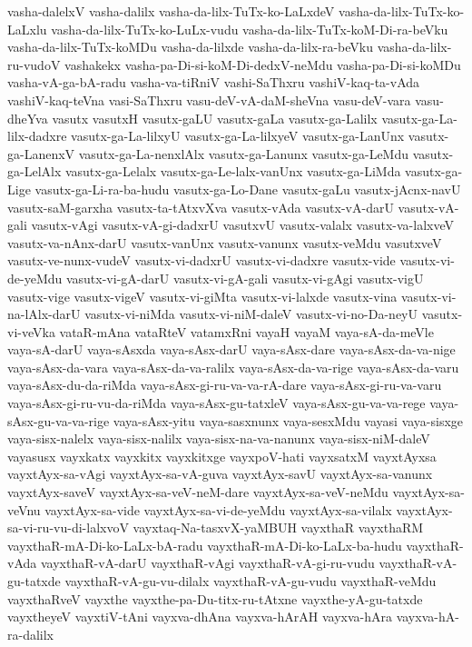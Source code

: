 {vasha-dalelxV
vasha-dalilx
vasha-da-lilx-TuTx-ko-LaLxdeV
vasha-da-lilx-TuTx-ko-LaLxlu
vasha-da-lilx-TuTx-ko-LuLx-vudu
vasha-da-lilx-TuTx-koM-Di-ra-beVku
vasha-da-lilx-TuTx-koMDu
vasha-da-lilxde
vasha-da-lilx-ra-beVku
vasha-da-lilx-ru-vudoV
vashakekx
vasha-pa-Di-si-koM-Di-dedxV-neMdu
vasha-pa-Di-si-koMDu
vasha-vA-ga-bA-radu
vasha-va-tiRniV
vashi-SaThxru
vashiV-kaq-ta-vAda
vashiV-kaq-teVna
vasi-SaThxru
vasu-deV-vA-daM-sheVna
vasu-deV-vara
vasu-dheYva
vasutx
vasutxH
vasutx-gaLU
vasutx-gaLa
vasutx-ga-Lalilx
vasutx-ga-La-lilx-dadxre
vasutx-ga-La-lilxyU
vasutx-ga-La-lilxyeV
vasutx-ga-LanUnx
vasutx-ga-LanenxV
vasutx-ga-La-nenxlAlx
vasutx-ga-Lanunx
vasutx-ga-LeMdu
vasutx-ga-LelAlx
vasutx-ga-Lelalx
vasutx-ga-Le-lalx-vanUnx
vasutx-ga-LiMda
vasutx-ga-Lige
vasutx-ga-Li-ra-ba-hudu
vasutx-ga-Lo-Dane
vasutx-gaLu
vasutx-jAcnx-navU
vasutx-saM-garxha
vasutx-ta-tAtxvXva
vasutx-vAda
vasutx-vA-darU
vasutx-vA-gali
vasutx-vAgi
vasutx-vA-gi-dadxrU
vasutxvU
vasutx-valalx
vasutx-va-lalxveV
vasutx-va-nAnx-darU
vasutx-vanUnx
vasutx-vanunx
vasutx-veMdu
vasutxveV
vasutx-ve-nunx-vudeV
vasutx-vi-dadxrU
vasutx-vi-dadxre
vasutx-vide
vasutx-vi-de-yeMdu
vasutx-vi-gA-darU
vasutx-vi-gA-gali
vasutx-vi-gAgi
vasutx-vigU
vasutx-vige
vasutx-vigeV
vasutx-vi-giMta
vasutx-vi-lalxde
vasutx-vina
vasutx-vi-na-lAlx-darU
vasutx-vi-niMda
vasutx-vi-niM-daleV
vasutx-vi-no-Da-neyU
vasutx-vi-veVka
vataR-mAna
vataRteV
vatamxRni
vayaH
vayaM
vaya-sA-da-meVle
vaya-sA-darU
vaya-sAsxda
vaya-sAsx-darU
vaya-sAsx-dare
vaya-sAsx-da-va-nige
vaya-sAsx-da-vara
vaya-sAsx-da-va-ralilx
vaya-sAsx-da-va-rige
vaya-sAsx-da-varu
vaya-sAsx-du-da-riMda
vaya-sAsx-gi-ru-va-va-rA-dare
vaya-sAsx-gi-ru-va-varu
vaya-sAsx-gi-ru-vu-da-riMda
vaya-sAsx-gu-tatxleV
vaya-sAsx-gu-va-va-rege
vaya-sAsx-gu-va-va-rige
vaya-sAsx-yitu
vaya-sasxnunx
vaya-sesxMdu
vayasi
vaya-sisxge
vaya-sisx-nalelx
vaya-sisx-nalilx
vaya-sisx-na-va-nanunx
vaya-sisx-niM-daleV
vayasusx
vayxkatx
vayxkitx
vayxkitxge
vayxpoV-hati
vayxsatxM
vayxtAyxsa
vayxtAyx-sa-vAgi
vayxtAyx-sa-vA-guva
vayxtAyx-savU
vayxtAyx-sa-vanunx
vayxtAyx-saveV
vayxtAyx-sa-veV-neM-dare
vayxtAyx-sa-veV-neMdu
vayxtAyx-sa-veVnu
vayxtAyx-sa-vide
vayxtAyx-sa-vi-de-yeMdu
vayxtAyx-sa-vilalx
vayxtAyx-sa-vi-ru-vu-di-lalxvoV
vayxtaq-Na-tasxvX-yaMBUH
vayxthaR
vayxthaRM
vayxthaR-mA-Di-ko-LaLx-bA-radu
vayxthaR-mA-Di-ko-LaLx-ba-hudu
vayxthaR-vAda
vayxthaR-vA-darU
vayxthaR-vAgi
vayxthaR-vA-gi-ru-vudu
vayxthaR-vA-gu-tatxde
vayxthaR-vA-gu-vu-dilalx
vayxthaR-vA-gu-vudu
vayxthaR-veMdu
vayxthaRveV
vayxthe
vayxthe-pa-Du-titx-ru-tAtxne
vayxthe-yA-gu-tatxde
vayxtheyeV
vayxtiV-tAni
vayxva-dhAna
vayxva-hArAH
vayxva-hAra
vayxva-hA-ra-dalilx
}
